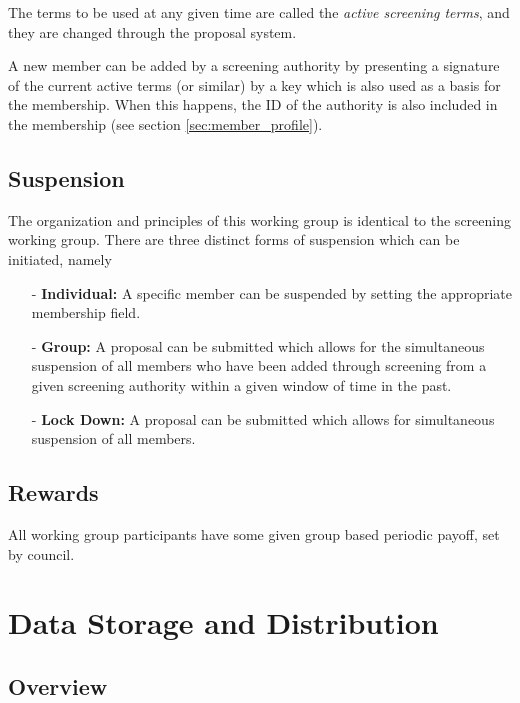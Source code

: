 \documentclass{article}
\begin{document}
The terms to be used at any given time are called the \textit{active screening terms}, and they are changed through the proposal system.

A new member can be added by a screening authority by presenting a signature of the current active terms (or similar) by a key which is also used as a basis for the membership. When this happens, the ID of the authority is also included in the membership (see section \ref{sec:member_profile}).

\subsection{Suspension} \label{sec:suspension}

The organization and principles of this working group is identical to the screening working group. There are three distinct forms of suspension which can be initiated, namely

\begin{itemize}
  \item[-] \textbf{Individual:} A specific member can be suspended by setting the appropriate membership field.

  \item[-] \textbf{Group:} A proposal can be submitted which allows for the simultaneous suspension of all members who have been added through screening from a given screening authority within a given window of time in the past.

  \item[-] \textbf{Lock Down:} A proposal can be submitted which allows for simultaneous suspension of all members.
\end{itemize}

\subsection{Rewards}

All working group participants have some given group based periodic payoff, set by council.

\section{Data Storage and Distribution} \label{sec:data_storage_and_distribution}

\subsection{Overview}
\end{document}

